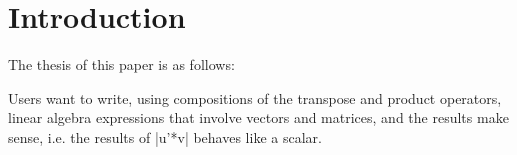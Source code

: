 \section{Introduction}

The thesis of this paper is as follows:

Users want to write, using compositions of the transpose and product operators, linear algebra expressions that involve vectors and matrices, and the results make sense, i.e. the results of \pre|u'*v| behaves like a scalar.